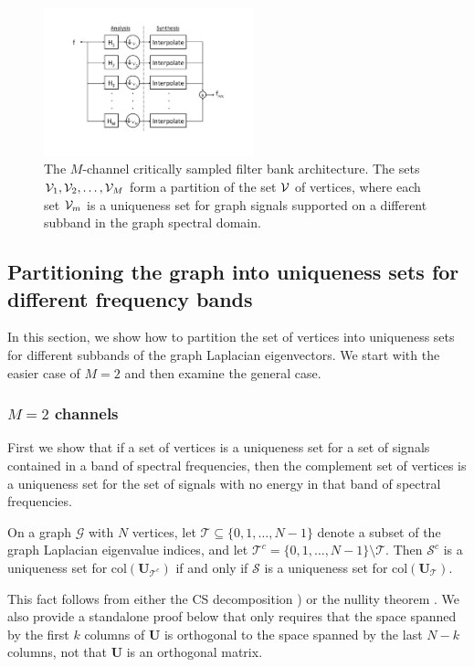 \documentclass[journal, 10pt]{IEEEtran}
\begin{document}
\begin{figure}[t]
\centerline{\includegraphics[width=2.4in]{fig_mcsfb_structure3}}
\caption{The $M$-channel critically sampled filter bank architecture. The sets ${\mathcal{V}}_1, {\mathcal{V}}_2, \ldots,{\mathcal{V}}_M$ form a partition of the set ${\mathcal{V}}$ of vertices, where each set ${\mathcal{V}}_m$ is a uniqueness set for graph signals supported on a different subband in the graph spectral domain.}\label{Fig:arch}
\end{figure}




\subsection{Partitioning the graph into uniqueness sets for different frequency bands}\label{Se:partition}

In this section, we show how to partition the set of vertices into uniqueness sets for different subbands of the graph Laplacian eigenvectors. We start with the easier case of $M=2$ and then examine the general case.

\subsubsection{$M=2$ channels}
First we show that if a set of vertices is a uniqueness set for a set of signals contained in a band of spectral frequencies, then the complement set of vertices is a uniqueness set for the set of signals with no energy in that band of spectral frequencies.
\begin{proposition}\label{Le:highpass_uniqueness}
On a graph ${\mathcal G}$ with $N$ vertices, let 
${\mathcal T} \subseteq \{0,1,\ldots,N-1\}$ denote a subset of the graph Laplacian eigenvalue indices, and let ${\mathcal T}^c=\{0,1,\ldots,N-1\} \setminus {\mathcal T}$.
Then 
$\mathcal{S}^c$ is a uniqueness set for $\mbox{col}({\mathbf{U}}_{{\mathcal T}^c})$
 if and only if
$\mathcal{S}$ is a uniqueness set for 
$\mbox{col}({\mathbf{U}}_{{\mathcal T}})$.
\end{proposition}
This fact follows from either the CS decomposition \cite[Equation (32)]{paige})
or the nullity theorem \cite[Theorem 2.1]{strangInterplay}.  
We also provide a standalone proof below that only requires that the space spanned by the first $k$ columns of ${\mathbf{U}}$ is orthogonal to the space spanned by the last $N-k$ columns, not that ${\mathbf{U}}$ is an orthogonal matrix.
\end{document}
